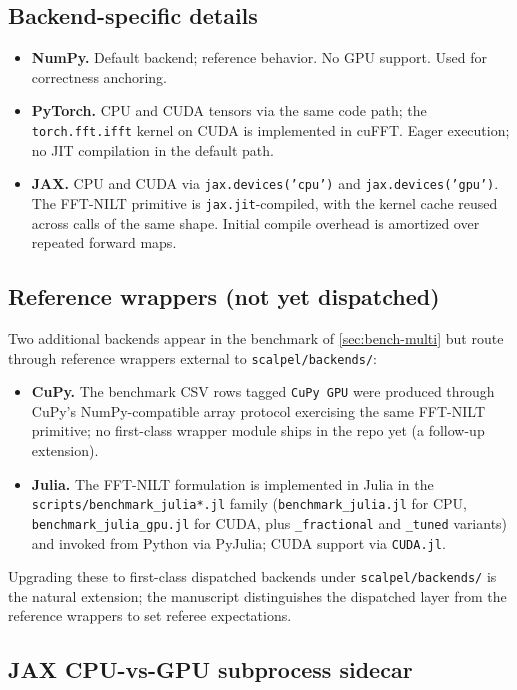 \documentclass[manuscript,review]{acmart}
\begin{document}
\subsection{Backend-specific details}

\begin{itemize}[leftmargin=*]
\item \textbf{NumPy.} Default backend; reference behavior. No GPU
support. Used for correctness anchoring.
\item \textbf{PyTorch.} CPU and CUDA tensors via the same code path;
the \texttt{torch.fft.ifft} kernel on CUDA is implemented in cuFFT.
Eager execution; no JIT compilation in the default path.
\item \textbf{JAX.} CPU and CUDA via \texttt{jax.devices('cpu')}
and \texttt{jax.devices('gpu')}. The FFT-NILT primitive is
\texttt{jax.jit}-compiled, with the kernel cache reused across
calls of the same shape. Initial compile overhead is amortized over
repeated forward maps.
\end{itemize}

\subsection{Reference wrappers (not yet dispatched)}

Two additional backends appear in the benchmark of
\cref{sec:bench-multi} but route through reference wrappers
external to \texttt{scalpel/backends/}:
\begin{itemize}[leftmargin=*]
\item \textbf{CuPy.} The benchmark CSV rows tagged
\texttt{CuPy GPU} were produced through CuPy's NumPy-compatible
array protocol exercising the same FFT-NILT primitive; no
first-class wrapper module ships in the repo yet (a follow-up
extension).
\item \textbf{Julia.} The FFT-NILT formulation is implemented in
Julia in the \texttt{scripts/benchmark\_julia*.jl} family
(\texttt{benchmark\_julia.jl} for CPU, \texttt{benchmark\_julia\_gpu.jl}
for CUDA, plus \texttt{\_fractional} and \texttt{\_tuned} variants)
and invoked from Python via PyJulia; CUDA support via
\texttt{CUDA.jl}.
\end{itemize}
Upgrading these to first-class dispatched backends under
\texttt{scalpel/backends/} is the natural extension; the manuscript
distinguishes the dispatched layer from the reference wrappers to
set referee expectations.

\subsection{JAX CPU-vs-GPU subprocess sidecar}\label{sec:jax-sidecar}
\end{document}
